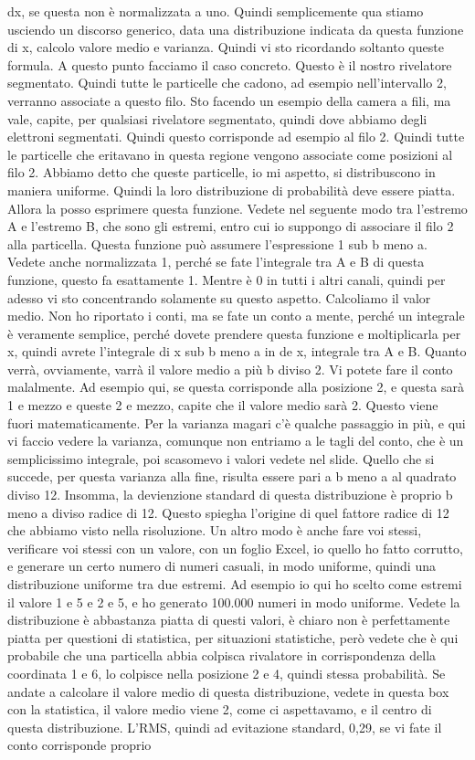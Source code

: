 {dx, se questa non è normalizzata a uno. Quindi semplicemente qua stiamo usciendo un discorso generico, data una distribuzione indicata da questa funzione di x, calcolo valore medio e varianza. Quindi vi sto ricordando soltanto queste formula. A questo punto facciamo il caso concreto. Questo è il nostro rivelatore segmentato. Quindi tutte le particelle che cadono, ad esempio nell'intervallo 2, verranno associate a questo filo. Sto facendo un esempio della camera a fili, ma vale, capite, per qualsiasi rivelatore segmentato, quindi dove abbiamo degli elettroni segmentati. Quindi questo corrisponde ad esempio al filo 2. Quindi tutte le particelle che eritavano in questa regione vengono associate come posizioni al filo 2. Abbiamo detto che queste particelle, io mi aspetto, si distribuscono in maniera uniforme. Quindi la loro distribuzione di probabilità deve essere piatta. Allora la posso esprimere questa funzione. Vedete nel seguente modo tra l'estremo A e l'estremo B, che sono gli estremi, entro cui io suppongo di associare il filo 2 alla particella. Questa funzione può assumere l'espressione 1 sub b meno a. Vedete anche normalizzata 1, perché se fate l'integrale tra A e B di questa funzione, questo fa esattamente 1. Mentre è 0 in tutti i altri canali, quindi per adesso vi sto concentrando solamente su questo aspetto. Calcoliamo il valor medio. Non ho riportato i conti, ma se fate un conto a mente, perché un integrale è veramente semplice, perché dovete prendere questa funzione e moltiplicarla per x, quindi avrete l'integrale di x sub b meno a in de x, integrale tra A e B. Quanto verrà, ovviamente, varrà il valore medio a più b diviso 2. Vi potete fare il conto malalmente. Ad esempio qui, se questa corrisponde alla posizione 2, e questa sarà 1 e mezzo e queste 2 e mezzo, capite che il valore medio sarà 2. Questo viene fuori matematicamente. Per la varianza magari c'è qualche passaggio in più, e qui vi faccio vedere la varianza, comunque non entriamo a le tagli del conto, che è un semplicissimo integrale, poi scasomevo i valori vedete nel slide. Quello che si succede, per questa varianza alla fine, risulta essere pari a b meno a al quadrato diviso 12. Insomma, la devienzione standard di questa distribuzione è proprio b meno a diviso radice di 12. Questo spiegha l'origine di quel fattore radice di 12 che abbiamo visto nella risoluzione. Un altro modo è anche fare voi stessi, verificare voi stessi con un valore, con un foglio Excel, io quello ho fatto corrutto, e generare un certo numero di numeri casuali, in modo uniforme, quindi una distribuzione uniforme tra due estremi. Ad esempio io qui ho scelto come estremi il valore 1 e 5 e 2 e 5, e ho generato 100.000 numeri in modo uniforme. Vedete la distribuzione è abbastanza piatta di questi valori, è chiaro non è perfettamente piatta per questioni di statistica, per situazioni statistiche, però vedete che è qui probabile che una particella abbia colpisca rivalatore in corrispondenza della coordinata 1 e 6, lo colpisce nella posizione 2 e 4, quindi stessa probabilità. Se andate a calcolare il valore medio di questa distribuzione, vedete in questa box con la statistica, il valore medio viene 2, come ci aspettavamo, e il centro di questa distribuzione. L'RMS, quindi ad evitazione standard, 0,29, se vi fate il conto corrisponde proprio }
